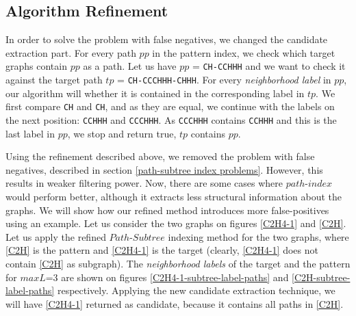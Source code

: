\documentclass{l4proj}
\theoremstyle{definition}
\begin{document}
\subsection{Algorithm Refinement}
  In order to solve the problem with false negatives, we changed the candidate extraction part. For every path $pp$ in the pattern index, we check which target graphs contain $pp$ as a path. Let us have $pp$ = \texttt{CH-CCHHH} and we want to check it against the target path $tp$ = \texttt{CH-CCCHHH-CHHH}. For every \textit{neighborhood label} in $pp$, our algorithm will whether it is contained in the corresponding label in $tp$. We first compare \texttt{CH} and \texttt{CH}, and as they are equal, we continue with the labels on the next position: \texttt{CCHHH} and \texttt{CCCHHH}. As \texttt{CCCHHH} contains \texttt{CCHHH} and this is the last label in $pp$, we stop and return true, $tp$ contains $pp$.\par
Using the refinement described above, we removed the problem with false negatives, described in section \ref{path-subtree index problems}. However, this results in weaker filtering power. Now, there are some cases where $path$-$index$ would perform better, although it extracts less structural information about the graphs. We will show how our refined method introduces more false-positives using an example. Let us consider the two graphs on figures \ref{C2H4-1} and \ref{C2H}. Let us apply the refined $Path$-$Subtree$ indexing method for the two graphs, where \ref{C2H} is the pattern and \ref{C2H4-1} is the target (clearly, \ref{C2H4-1} does not contain \ref{C2H} as subgraph). The \textit{neighborhood labels} of the target and the pattern for $maxL$=3 are shown on figures \ref{C2H4-1-subtree-label-paths} and \ref{C2H-subtree-label-paths} respectively. Applying the new candidate extraction technique, we will have \ref{C2H4-1} returned as candidate, because it contains all paths in \ref{C2H}.\par
\end{document}
